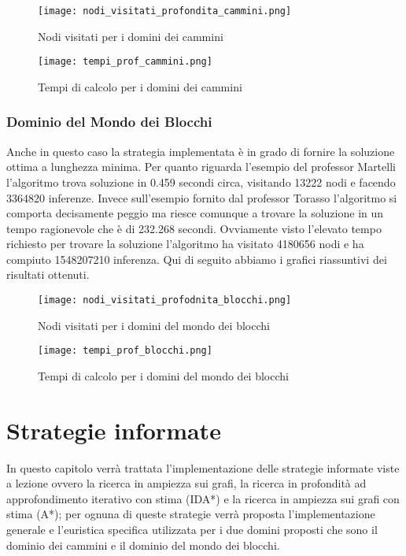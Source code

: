 \begin{figure}[htp]
  \texttt{[image: nodi\_visitati\_profondita\_cammini.png]}
  \caption{Nodi visitati per i domini dei cammini}
  \label{fig:figure5}
\end{figure}

\begin{figure}[htp]
  \texttt{[image: tempi\_prof\_cammini.png]}
  \caption{Tempi di calcolo per i domini dei cammini}
  \label{fig:figure6}
\end{figure}

\subsection{Dominio del Mondo dei Blocchi}
Anche in questo caso la strategia implementata è in grado di fornire la soluzione ottima a lunghezza minima. Per quanto riguarda l'esempio del professor Martelli l'algoritmo trova soluzione in 0.459 secondi circa, visitando 13222 nodi e facendo 3364820 inferenze. Invece sull'esempio fornito dal professor Torasso l'algoritmo si comporta decisamente peggio ma riesce comunque a trovare la soluzione in un tempo ragionevole che è di 232.268 secondi. Ovviamente visto l'elevato tempo richiesto per trovare la soluzione l'algoritmo ha visitato 4180656 nodi e ha compiuto 1548207210 inferenza.
Qui di seguito abbiamo i grafici riassuntivi dei risultati ottenuti.

\begin{figure}[htp]
  \texttt{[image: nodi\_visitati\_profodnita\_blocchi.png]}
  \caption{Nodi visitati per i domini del mondo dei blocchi}
  \label{fig:figure7}
\end{figure}

\begin{figure}[htp]
  \texttt{[image: tempi\_prof\_blocchi.png]}
  \caption{Tempi di calcolo per i domini del mondo dei blocchi}
  \label{fig:figure8}
\end{figure}

\chapter{Strategie informate}
In questo capitolo verrà trattata l'implementazione delle strategie informate viste a lezione ovvero la ricerca in ampiezza sui grafi, la ricerca in profondità ad approfondimento iterativo con stima (IDA*) e la ricerca in ampiezza sui grafi con stima (A*); per ognuna di queste strategie verrà proposta l'implementazione generale e l'euristica specifica utilizzata per i due domini proposti che sono il dominio dei cammini e il dominio del mondo dei blocchi.

